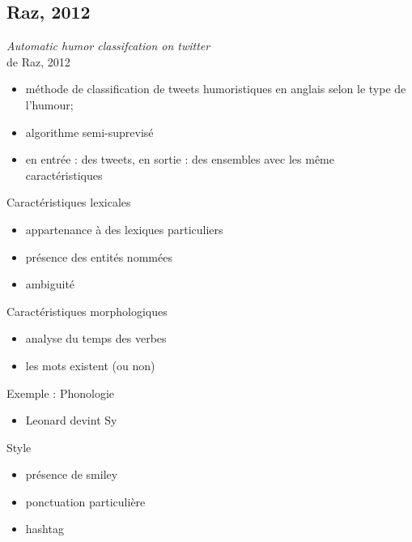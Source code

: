 \documentclass{beamer}
\begin{document}
\subsection{Raz, 2012}
\begin{frame}[allowframebreaks]{\textit{Automatic humor classifcation on twitter}\\ de Raz, 2012 \cite{Raz12}}

\begin{itemize}
 \item méthode de classification de tweets humoristiques en anglais selon le type de l’humour;
\item algorithme semi-suprevisé
\item en entrée : des tweets, en sortie : des ensembles avec les même caractéristiques
\end{itemize}

\begin{block}{Caractéristiques lexicales}
\begin{itemize}
\item appartenance à des lexiques particuliers
\item présence des entités nommées
\item ambiguité
\end{itemize}
\end{block}

\begin{block}{Caractéristiques morphologiques}
\begin{itemize}
\item analyse du temps des verbes
\item les mots existent (ou non)
\end{itemize}
\end{block}

\vspace*{1.1cm}
\begin{exampleblock}{Exemple : Phonologie}
\begin{itemize}
\item Leonard devint Sy
\end{itemize}
\end{exampleblock}

\vspace*{1.1cm}
\begin{block}{Style}
\begin{itemize}
\item présence de smiley
\item ponctuation particulière
\item hashtag
\end{itemize}
\end{block}


\end{frame}
\end{document}
